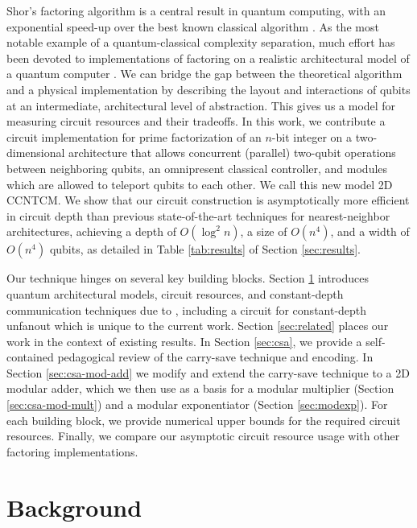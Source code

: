 \documentclass[twoside]{article}
\begin{document}
Shor's factoring algorithm is a central result in quantum computing, with an
exponential speed-up over the best known classical algorithm \cite{Shor1994}.
As the most notable example of a quantum-classical complexity separation, much
effort has been devoted to implementations of factoring on a
realistic architectural model of a quantum computer
\cite{Beauregard2002,Kutin2006,VanMeter2006,VanMeter2005,VanMeterIL2005}.
We can bridge the gap between
the theoretical algorithm and a physical implementation by describing
the layout and interactions of qubits at an intermediate,
architectural level of abstraction.
This gives us a model for measuring circuit resources and their tradeoffs.
In this work, we contribute a circuit implementation for prime
factorization of an $n$-bit integer
on a two-dimensional architecture that allows concurrent (parallel) two-qubit operations
between neighboring qubits, an omnipresent classical controller, and
modules which are allowed to teleport qubits to each other. We call this new
model \textsc{2D CCNTCM}.
We show that our circuit construction is asymptotically more efficient in circuit depth than previous state-of-the-art techniques for nearest-neighbor
architectures, achieving a depth of $O(\log^2 n)$, a size of
$O(n^4)$, and a width of $O(n^4)$ qubits, as detailed in Table
\ref{tab:results} of Section \ref{sec:results}.

Our technique hinges on several key building blocks.
Section \ref{sec:bg} introduces quantum architectural models, circuit
resources, and constant-depth communication techniques due to
\cite{Harrow2012,Rosenbaum2012}, including a circuit for
constant-depth unfanout which is unique to the current work.
Section \ref{sec:related} places our work in the context of existing
results.
In Section \ref{sec:csa}, we provide a self-contained pedagogical review
of the carry-save technique and encoding.
In Section \ref{sec:csa-mod-add} we modify and extend the carry-save technique to a 2D
modular adder,
which we then use as a basis for a modular multiplier
(Section \ref{sec:csa-mod-mult}) and a modular exponentiator
(Section \ref{sec:modexp}).
For each building block, we provide numerical upper bounds for the
required circuit resources.
Finally, we compare our asymptotic circuit resource usage
with other factoring implementations.

%
\section{Background}
\label{sec:bg}
\end{document}
